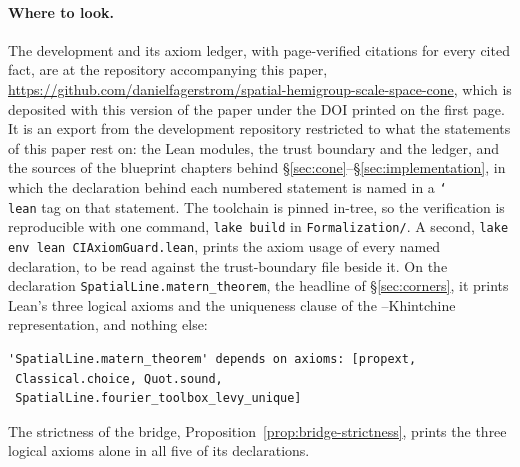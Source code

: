 \paragraph{Where to look.} The development and its axiom ledger, with page-verified citations
for every cited fact, are at the repository accompanying this paper,
\url{https://github.com/danielfagerstrom/spatial-hemigroup-scale-space-cone}, which is deposited
with this version of the paper under the DOI printed on the first page. It is an export from
the development repository restricted to what the statements of this paper rest on: the Lean
modules, the trust boundary and the ledger, and the sources of the blueprint chapters behind
\S\ref{sec:cone}--\S\ref{sec:implementation}, in which the declaration behind each numbered
statement is named in a \texttt{\char`\\lean} tag on that statement. The toolchain is pinned
in-tree, so the verification is reproducible with one command, \texttt{lake build} in
\texttt{Formalization/}. A second, \texttt{lake env lean CIAxiomGuard.lean}, prints the axiom
usage of every named declaration, to be read against the trust-boundary file beside it. On the
declaration \texttt{SpatialLine.matern\_theorem}, the headline of \S\ref{sec:corners}, it prints
Lean's three logical axioms and the uniqueness clause of the \Levy--Khintchine representation,
and nothing else:
\begin{verbatim}
'SpatialLine.matern_theorem' depends on axioms: [propext,
 Classical.choice, Quot.sound,
 SpatialLine.fourier_toolbox_levy_unique]
\end{verbatim}
The strictness of the bridge, Proposition~\ref{prop:bridge-strictness}, prints the three
logical axioms alone in all five of its declarations.
